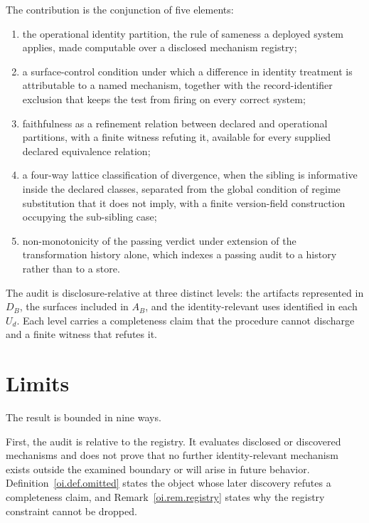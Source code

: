 \documentclass[11pt]{article}
\theoremstyle{plain}
\theoremstyle{definition}
\theoremstyle{remark}
\begin{document}
The contribution is the conjunction of five elements:
\begin{enumerate}[label=(\arabic*)]
  \item the operational identity partition,
        the rule of sameness a deployed system applies,
        made computable over a disclosed mechanism registry;
  \item a surface-control condition
        under which a difference in identity treatment
        is attributable to a named mechanism,
        together with the record-identifier exclusion
        that keeps the test from firing on every correct system;
  \item faithfulness as a refinement relation
        between declared and operational partitions,
        with a finite witness refuting it,
        available for every supplied declared equivalence relation;
  \item a four-way lattice classification of divergence,
        when the sibling is informative inside the declared classes,
        separated from the global condition of regime substitution
        that it does not imply,
        with a finite version-field construction
        occupying the sub-sibling case;
  \item non-monotonicity of the passing verdict
        under extension of the transformation history alone,
        which indexes a passing audit to a history rather than to a store.
\end{enumerate}

The audit is disclosure-relative at three distinct levels:
the artifacts represented in \(D_B\),
the surfaces included in \(A_B\),
and the identity-relevant uses identified in each \(U_d\).
Each level carries a completeness claim
that the procedure cannot discharge
and a finite witness that refutes it.

\section{Limits}
\label{oi.sec.limits}

The result is bounded in nine ways.

First, the audit is relative to the registry.
It evaluates disclosed or discovered mechanisms
and does not prove that no further identity-relevant mechanism
exists outside the examined boundary or will arise in future behavior.
Definition~\ref{oi.def.omitted} states the object
whose later discovery refutes a completeness claim,
and Remark~\ref{oi.rem.registry} states why
the registry constraint cannot be dropped.
\end{document}
